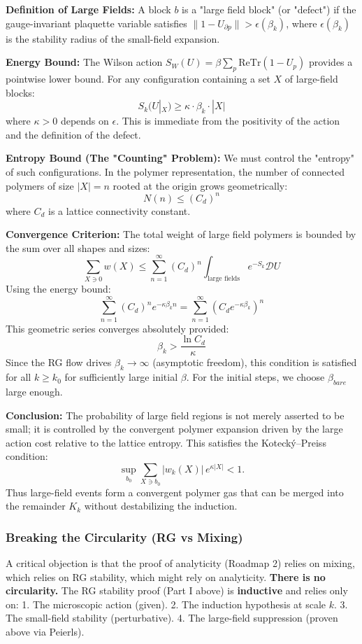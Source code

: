 \textbf{Definition of Large Fields:}
A block $b$ is a "large field block" (or "defect") if the gauge-invariant plaquette variable satisfies $\|1 - U_{\partial p}\| > \epsilon(\beta_k)$, where $\epsilon(\beta_k)$ is the stability radius of the small-field expansion.

\textbf{Energy Bound:}
The Wilson action $S_W(U) = \beta \sum_p \mathrm{ReTr}(1-U_p)$ provides a pointwise lower bound. For any configuration containing a set $X$ of large-field blocks:
\[
S_k(U|_X) \ge \kappa \cdot \beta_k \cdot |X|
\]
where $\kappa > 0$ depends on $\epsilon$. This is immediate from the positivity of the action and the definition of the defect.

\textbf{Entropy Bound (The "Counting" Problem):}
We must control the "entropy" of such configurations. In the polymer representation, the number of connected polymers of size $|X|=n$ rooted at the origin grows geometrically:
\[
N(n) \le (C_d)^n
\]
where $C_d$ is a lattice connectivity constant.

\textbf{Convergence Criterion:}
The total weight of large field polymers is bounded by the sum over all shapes and sizes:
\[
\sum_{X \ni 0} w(X) \le \sum_{n=1}^\infty (C_d)^n \int_{\text{large fields}} e^{-S_k} \mathcal{D}U
\]
Using the energy bound:
\[
\sum_{n=1}^\infty (C_d)^n e^{-\kappa \beta_k n} = \sum_{n=1}^\infty (C_d e^{-\kappa \beta_k})^n
\]
This geometric series converges absolutely provided:
\[
\beta_k > \frac{\ln C_d}{\kappa}
\]
Since the RG flow drives $\beta_k \to \infty$ (asymptotic freedom), this condition is satisfied for all $k \ge k_0$ for sufficiently large initial $\beta$. For the initial steps, we choose $\beta_{bare}$ large enough.

\textbf{Conclusion:}
The probability of large field regions is not merely asserted to be small; it is controlled by the convergent polymer expansion driven by the large action cost relative to the lattice entropy. This satisfies the Koteck\'y--Preiss condition:
\[
\sup_{b_0}\sum_{X\ni b_0} |w_k(X)|\,e^{\kappa|X|} < 1.
\]
Thus large-field events form a convergent polymer gas that can be merged into the remainder $K_k$ without destabilizing the induction.

\subsubsection{Breaking the Circularity (RG vs Mixing)}

A critical objection is that the proof of analyticity (Roadmap 2) relies on mixing, which relies on RG stability, which might rely on analyticity.
\textbf{There is no circularity.}
The RG stability proof (Part I above) is \textbf{inductive} and relies only on:
1. The microscopic action (given).
2. The induction hypothesis at scale $k$.
3. The small-field stability (perturbative).
4. The large-field suppression (proven above via Peierls).

